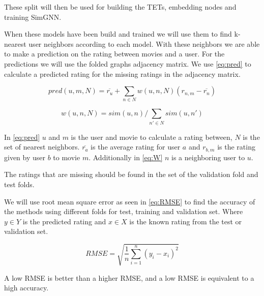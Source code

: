 These split will then be used for building the TETs, embedding nodes and training SimGNN.

When these models have been build and trained we will use them to find k-nearest user neighbors according  to each model. With these neighbors we are able to make a prediction on the rating between movies and a user. For the predictions we will use the folded graphs adjacency matrix. We use \autoref{eq:pred} to calculate a predicted rating for the missing ratings in the adjacency matrix.

\begin{equation}\label{eq:pred}
pred(u,m,N) = \overline{r_u}+\sum_{n \in N}w(u,n, N)(r_{n,m}-\overline{r_n})
\end{equation}

\begin{equation}\label{eq:W}
w(u,n, N)=sim(u,n)/\sum_{n' \in N} sim(u,n')
\end{equation}

In \autoref{eq:pred} $u$ and $m$ is the user and movie to calculate a rating between, $N$ is the set of nearest neighbors. $\overline{r_a}$ is the average rating for user $a$ and $r_{b,m}$ is the rating given by user $b$ to movie $m$.
Additionally in \autoref{eq:W} $n$ is a neighboring user to $u$.

The ratings that are missing should be found in the set of the validation fold and test folds.

We will use root mean square error as seen in  \autoref{eq:RMSE}\cite{chai2014root} to find the accuracy of the methods using different folds for test, training and validation set. Where $y \in Y$ is the predicted rating and $x \in X$ is the known rating from the test or validation set.

\begin{equation}\label{eq:RMSE}
RMSE = \sqrt{\frac{1}{n}\sum^n_{i=1}(y_i - x_i)^2}
\end{equation}

A low RMSE is better than a higher RMSE, and a low RMSE is equivalent to a high accuracy.

